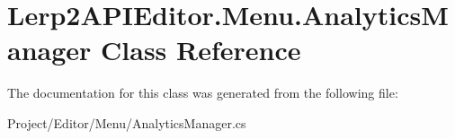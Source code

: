 \hypertarget{class_lerp2_a_p_i_editor_1_1_menu_1_1_analytics_manager}{}\section{Lerp2\+A\+P\+I\+Editor.\+Menu.\+Analytics\+Manager Class Reference}
\label{class_lerp2_a_p_i_editor_1_1_menu_1_1_analytics_manager}


The documentation for this class was generated from the following file\+:\begin{DoxyCompactItemize}
\item 
Project/\+Editor/\+Menu/Analytics\+Manager.\+cs\end{DoxyCompactItemize}
